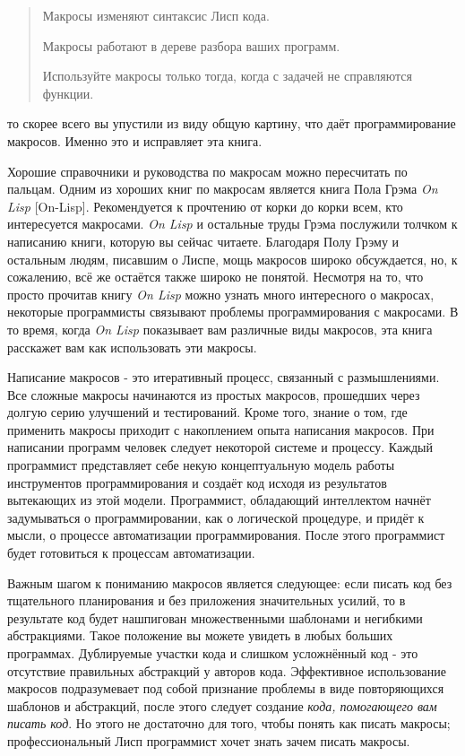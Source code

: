 \begin{quote}
Макросы изменяют синтаксис Лисп кода.

Макросы работают в дереве разбора ваших программ.

Используйте макросы только тогда, когда с задачей не справляются функции.
\end{quote}
то скорее всего вы упустили из виду общую картину, что даёт программирование макросов. Именно это и исправляет эта книга.

Хорошие справочники и руководства по макросам можно пересчитать по пальцам. Одним из хороших книг по макросам является книга Пола Грэма \emph{On Lisp} [On-Lisp]. Рекомендуется к прочтению от корки до корки всем, кто интересуется макросами. \emph{On Lisp} и остальные труды Грэма послужили толчком к написанию книги, которую вы сейчас читаете. Благодаря Полу Грэму и остальным людям, писавшим о Лиспе, мощь макросов широко обсуждается, но, к сожалению, всё же остаётся также широко не понятой. Несмотря на то, что просто прочитав книгу \emph{On Lisp} можно узнать много интересного о макросах, некоторые программисты связывают проблемы программирования с макросами. В то время, когда \emph{On Lisp} показывает вам различные виды макросов, эта книга расскажет вам как использовать эти макросы.

Написание макросов - это итеративный процесс, связанный с размышлениями. Все сложные макросы начинаются из простых макросов, прошедших через долгую серию улучшений и тестирований. Кроме того, знание о том, где применить макросы приходит с накоплением опыта написания макросов. При написании программ человек следует некоторой системе и процессу. Каждый программист представляет себе некую концептуальную модель работы инструментов программирования и создаёт код исходя из результатов вытекающих из этой модели. Программист, обладающий интеллектом начнёт задумываться о программировании, как о логической процедуре, и придёт к мысли, о процессе автоматизации программирования. После этого программист будет готовиться к процессам автоматизации.

Важным шагом к пониманию макросов является следующее: если писать код без тщательного планирования и без приложения значительных усилий, то в результате код будет нашпигован множественными шаблонами и негибкими абстракциями. Такое положение вы можете увидеть в любых больших программах. Дублируемые участки кода и слишком усложнённый код - это отсутствие правильных абстракций у авторов кода. Эффективное использование макросов подразумевает под собой признание проблемы в виде повторяющихся шаблонов и абстракций, после этого следует создание \emph{кода, помогающего вам писать код}. Но этого не достаточно для того, чтобы понять как писать макросы; профессиональный Лисп программист хочет знать зачем писать макросы.

